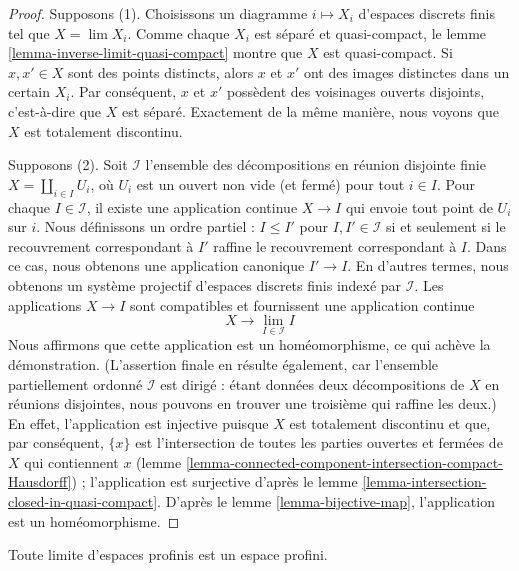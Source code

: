 \begin{proof}
Supposons (1). Choisissons un diagramme $i \mapsto X_i$ d'espaces discrets finis
tel que $X = \lim X_i$. Comme chaque $X_i$ est séparé et quasi-compact, le
lemme \ref{lemma-inverse-limit-quasi-compact} montre que $X$ est quasi-compact.
Si $x, x' \in X$ sont des points distincts, alors $x$ et $x'$ ont des images
distinctes dans un certain $X_i$. Par conséquent, $x$ et $x'$ possèdent des
voisinages ouverts disjoints, c'est-à-dire que $X$ est séparé. Exactement de la
même manière, nous voyons que $X$ est totalement discontinu.

\medskip\noindent
Supposons (2). Soit $\mathcal{I}$ l'ensemble des décompositions en réunion
disjointe finie $X = \coprod_{i \in I} U_i$, où $U_i$ est un ouvert non vide
(et fermé) pour tout $i \in I$.
Pour chaque $I \in \mathcal{I}$, il existe une application continue
$X \to I$ qui envoie tout point de $U_i$ sur $i$. Nous définissons un ordre
partiel : $I \leq I'$ pour $I, I' \in \mathcal{I}$ si et seulement si le
recouvrement correspondant à $I'$ raffine le recouvrement correspondant à
$I$. Dans ce cas, nous obtenons une application canonique $I' \to I$. En
d'autres termes, nous obtenons un système projectif d'espaces discrets finis
indexé par $\mathcal{I}$.
Les applications $X \to I$ sont compatibles et fournissent une application
continue
$$
X \longrightarrow \lim_{I \in \mathcal{I}} I
$$
Nous affirmons que cette application est un homéomorphisme, ce qui achève la
démonstration. (L'assertion finale en résulte également, car l'ensemble
partiellement ordonné $\mathcal{I}$ est dirigé : étant données deux
décompositions de $X$ en réunions disjointes, nous pouvons en trouver une
troisième qui raffine les deux.)
En effet, l'application est injective puisque $X$ est totalement discontinu
et que, par conséquent, $\{x\}$ est l'intersection de toutes les parties
ouvertes et fermées de $X$ qui contiennent $x$
(lemme \ref{lemma-connected-component-intersection-compact-Hausdorff}) ;
l'application est surjective d'après le
lemme \ref{lemma-intersection-closed-in-quasi-compact}.
D'après le lemme \ref{lemma-bijective-map}, l'application est un homéomorphisme.
\end{proof}

\begin{lemma}
\label{lemma-directed-inverse-limit-profinite}
Toute limite d'espaces profinis est un espace profini.
\end{lemma}

